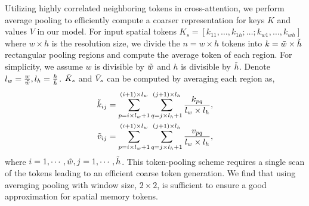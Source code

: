 Utilizing highly correlated neighboring tokens in cross-attention, we perform average pooling to efficiently compute a coarser representation for keys $K$ and values $V$ in our model. For input spatial tokens $K_s = [k_{11}, \dots, k_{1h}; \dots; k_{w1}, \dots, k_{wh}]$ where $w \times h$ is the resolution size, we divide the $n = w\times h$ tokens into $k = \Tilde{w}\times \Tilde{h}$ rectangular pooling regions and compute the average token of each region. For simplicity, we assume $w$ is divisible by $\Tilde{w}$ and $h$ is divisible by $\Tilde{h}$. Denote $l_w = \frac{w}{\Tilde{w}}, l_h = \frac{h}{\Tilde{h}}$. $\Tilde{K}_s$ and $\Tilde{V}_s$ can be computed by averaging each region as,   
\begin{align}\label{eq:keys-values}
\small
\Tilde{k}_{ij} & = \sum_{p = i \times l_w + 1}^{(i + 1) \times l_w}\sum_{q = j \times l_h + 1}^{(j + 1) \times l_h} \frac{k_{pq}}{l_w \times l_h}, \nonumber \\
\Tilde{v}_{ij} & = \sum_{p = i \times l_w + 1}^{(i + 1) \times l_w}\sum_{q = j \times l_h + 1}^{(j + 1) \times l_h} \frac{v_{pq}}{l_w \times l_h}, 
\end{align}
where $i = 1, \cdots, \Tilde{w}, j=1, \cdots, \Tilde{h}$. This token-pooling scheme requires a single scan
of the tokens leading to an efficient coarse token generation. We find that using averaging pooling with window size, $2 \times 2$, is sufficient to ensure a good approximation for spatial memory tokens. 

